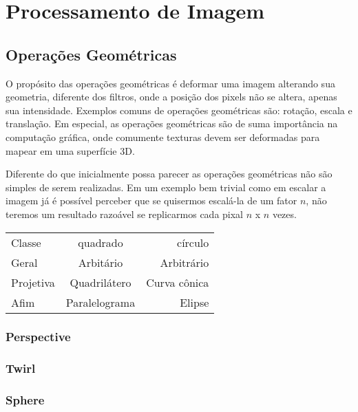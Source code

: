 
\chapter{Processamento de Imagem}

\section{Operações Geométricas}
\par
O propósito das operações geométricas é deformar uma imagem alterando sua
geometria, diferente dos filtros, onde a posição dos pixels não se altera,
apenas sua intensidade. Exemplos comuns de operações geométricas são: rotação,
escala e translação. Em especial, as operações geométricas são de suma
importância na computação gráfica, onde comumente texturas devem ser deformadas
para mapear em uma superfície 3D.

\par
Diferente do que inicialmente possa parecer as operações geométricas não são
simples de serem realizadas. Em um exemplo bem trivial como em escalar a imagem
já é possível perceber que se quisermos escalá-la de um fator $n$, não teremos
um resultado razoável se replicarmos cada pixal $n$ x $n$ vezes.

\begin{center}
\begin{tabular}{ l c r }
  Classe & quadrado & círculo \\
  Geral & Arbitário & Arbitrário \\
  Projetiva & Quadrilátero & Curva cônica \\
  Afim & Paralelograma & Elipse \\
\end{tabular}
\end{center}

\subsection{Perspective}

\subsection{Twirl}

\subsection{Sphere}


